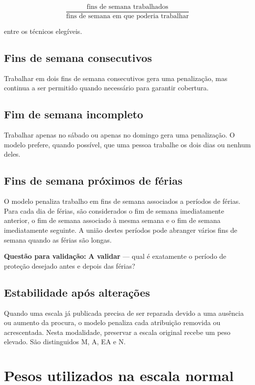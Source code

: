\documentclass[11pt,a4paper]{article}
\newcommand{\validar}{\textcolor{blue!70!black}{\textbf{A validar}}}
\begin{document}
\[
\frac{\text{fins de semana trabalhados}}
     {\text{fins de semana em que poderia trabalhar}}
\]

entre os técnicos elegíveis.

\subsection{Fins de semana consecutivos}

Trabalhar em dois fins de semana consecutivos gera uma penalização, mas continua
a ser permitido quando necessário para garantir cobertura.

\subsection{Fim de semana incompleto}

Trabalhar apenas no sábado ou apenas no domingo gera uma penalização. O modelo
prefere, quando possível, que uma pessoa trabalhe os dois dias ou nenhum deles.

\subsection{Fins de semana próximos de férias}

O modelo penaliza trabalho em fins de semana associados a períodos de férias.
Para cada dia de férias, são considerados o fim de semana imediatamente anterior,
o fim de semana associado à mesma semana e o fim de semana imediatamente
seguinte. A união destes períodos pode abranger vários fins de semana quando as
férias são longas.

\textbf{Questão para validação:} \validar{} --- qual é exatamente o período de
proteção desejado antes e depois das férias?

\subsection{Estabilidade após alterações}

Quando uma escala já publicada precisa de ser reparada devido a uma ausência ou
aumento da procura, o modelo penaliza cada atribuição removida ou acrescentada.
Nesta modalidade, preservar a escala original recebe um peso elevado. São
distinguidos M, A, EA e N.

\section{Pesos utilizados na escala normal}
\end{document}
